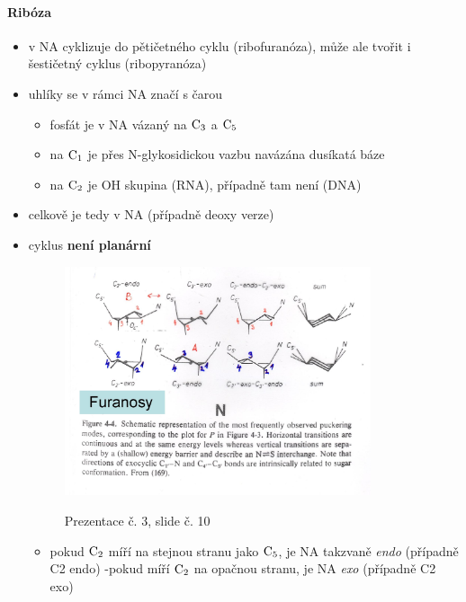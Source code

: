 \documentclass[DIV=8]{scrreprt}
\begin{document}
\paragraph{Ribóza}
\begin{itemize}[nosep]
    \item v NA cyklizuje do pětičetného cyklu (ribofuranóza), může ale tvořit i šestičetný cyklus (ribopyranóza)
    \item uhlíky se v rámci NA značí s čarou
\begin{itemize}[nosep]
    \item fosfát je v NA vázaný na \(\ce{C3}\) a \(\ce{C5}\)
    \item na \(\ce{C1}\) je přes N-glykosidickou vazbu navázána dusíkatá báze
    \item na \(\ce{C2}\) je OH skupina (RNA), případně tam není (DNA)
\end{itemize}

    \item celkově je tedy v NA (případně deoxy verze)
    \item cyklus \textbf{není planární} \begin{figure}
    \caption{Prezentace č. 3, slide č. 10}
    \includegraphics[width=0.85\textwidth]{slides-3/slide-10.jpg}
    \centering
    \label{slides-3-slide-10}
\end{figure}

\begin{itemize}[nosep]
    \item pokud \(\ce{C2}\) míří na stejnou stranu jako \(\ce{C5}\), je NA takzvaně \emph{endo} (případně C2 endo)
    -pokud míří \(\ce{C2}\) na opačnou stranu, je NA \emph{exo} (případně C2 exo)
\end{itemize}

\end{itemize}
\end{document}
